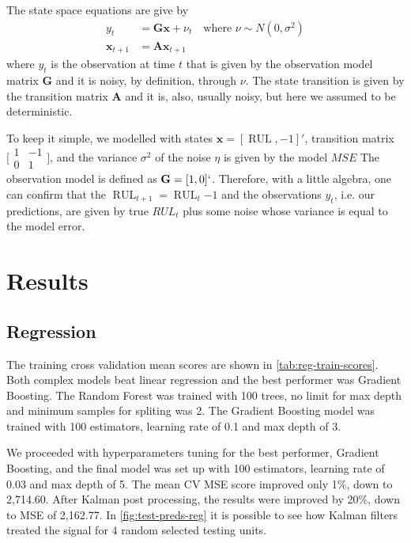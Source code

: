 \documentclass[letterpaper, 10 pt, conference, onecolumn]{ieeeconf}  %
\begin{document}
The state space equations are give by
\begin{align}
	y_{t} &= \mathbf{G}\mathbf{x} + \nu_t \quad \text{where $\nu \sim N(0, \sigma^2)$} \\
	\mathbf{x}_{t+1} &= \mathbf{A}\mathbf{x}_{t+1}
\end{align}
where $y_t$ is the observation at time $t$ that is given by the observation model matrix $\mathbf{G}$ and it is noisy, by definition, through $\nu$. The state transition is given by the transition matrix $\mathbf{A}$ and it is, also, usually noisy, but here we assumed to be deterministic.

To keep it simple, we modelled with states $\mathbf{x} = [\operatorname{RUL}, -1]'$, transition matrix $\bigl[ \begin{smallmatrix}1&-1 \\ 0&1\end{smallmatrix} \bigr]$, and the variance $\sigma^2$ of the noise $\eta$ is given by the model $MSE$ The observation model is defined as $\mathbf{G} = [1, 0]`$. Therefore, with a little algebra, one can confirm that the $\operatorname{RUL}_{t+1} = \operatorname{RUL}_t{ - 1}$ and the observations $y_t$, i.e. our predictions, are given by true $RUL_t$ plus some noise whose variance is equal to the model error.


\section{Results}\label{sec:results}
\subsection{Regression}
The training cross validation mean scores are shown in \autoref{tab:reg-train-scores}. Both complex models beat linear regression and the best performer was Gradient Boosting. The Random Forest was trained with 100 trees, no limit for max depth and minimum samples for spliting was 2. The Gradient Boosting model was trained with 100 estimators, learning rate of 0.1 and max depth of 3.

We proceeded with hyperparameters tuning for the best performer, Gradient Boosting, and the final model was set up with 100 estimators, learning rate of 0.03 and max depth of 5. The mean CV MSE score improved only 1\%, down to 2,714.60. After Kalman post processing, the results were improved by 20\%, down to MSE of 2,162.77. In \autoref{fig:test-preds-reg} it is possible to see how Kalman filters treated the signal for 4 random selected testing units.
\end{document}
